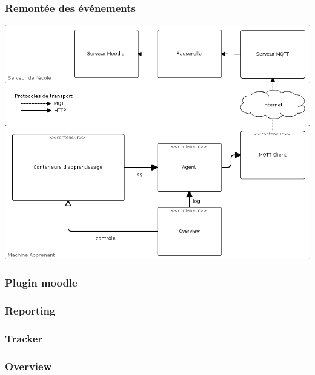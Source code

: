 \documentclass[10pt, compress]{beamer}
\begin{document}
\begin{frame}[fragile]
  \frametitle{Remontée des événements}
  \begin{center}
  \includegraphics[scale = 0.32]{architecture.png}
   \end{center}
\end{frame}

\begin{frame}[fragile]
  \frametitle{Plugin moodle}
  \begin{center}

   \end{center}
\end{frame}

\begin{frame}[fragile]
  \frametitle{Reporting}
  \begin{center}

   \end{center}
\end{frame}

\begin{frame}[fragile]
  \frametitle{Tracker}
  \begin{center}

   \end{center}
\end{frame}

\begin{frame}[fragile]
  \frametitle{Overview}
  \begin{center}

   \end{center}
\end{frame}
\end{document}
